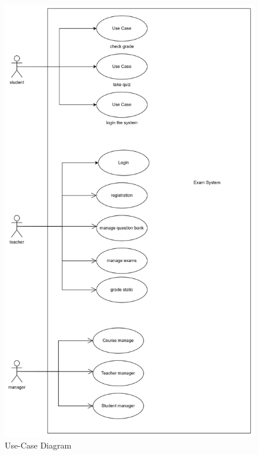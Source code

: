 \documentclass{article}
\begin{document}
\begin{figure}[h!]
    \centering
    \includegraphics[width=\textwidth]{use_case_diagram.png}
    \caption{Use-Case Diagram}
\end{figure}

% 

% 

% 
\end{document}
